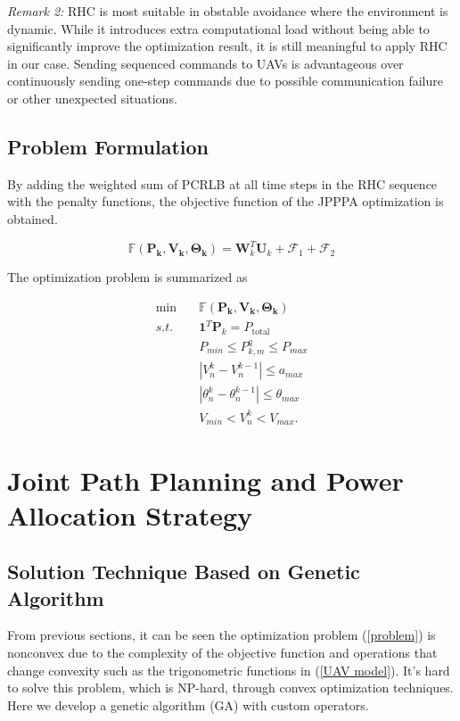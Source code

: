 \documentclass[12pt,journal,draftclsnofoot,onecolumn]{IEEEtran}
\begin{document}
\emph{Remark 2:} RHC is most suitable in obstable avoidance\cite{frew2005receding} where the environment is dynamic. While it introduces extra computational load without being able to significantly improve the optimization result, it is still meaningful to apply RHC in our case. Sending sequenced commands to UAVs is advantageous over continuously sending one-step commands due to possible communication failure or other unexpected situations.

\subsection{Problem Formulation}
By adding the weighted sum of PCRLB at all time steps in the RHC sequence with the penalty functions, the objective function of the JPPPA optimization is obtained.

\begin{equation}
	\mathbb{F}(\mathbf{P_k},\mathbf{V_k},\mathbf{\Theta_k})=\mathbf{W}_k^T\mathbf{U}_k + \mathcal{F}_1 + \mathcal{F}_2
\end{equation}

The optimization problem is summarized as

\begin{align} 
\min \quad & \mathbb{F}(\mathbf{P_k},\mathbf{V_k},\mathbf{\Theta_k})\nonumber\\ s.t.\quad & {{{\mathbf 1}^T}{{\mathbf P}_k}={P_{\text{total}}}} \nonumber\\ & P_{min}\leq P_{k,m}^q\leq P_{max}\nonumber\\ &|V_n^k-V_n^{k-1}|\leq a_{max} \nonumber\\ &|\theta_n^k-\theta_n^{k-1}|\leq \theta_{max}\\ &V_{min}<V_n^k<V_{max} . 
\label{problem}
\end{align}

\section{Joint Path Planning and Power Allocation Strategy}


\subsection{Solution Technique Based on Genetic Algorithm}
From previous sections, it can be seen the optimization problem (\ref{problem}) is nonconvex due to the complexity of the objective function and operations that change convexity such as the trigonometric functions in (\ref{UAV model}). It's hard to solve this problem, which is NP-hard, through convex optimization techniques. Here we develop a genetic algorithm (GA) with custom operators. 
\end{document}
